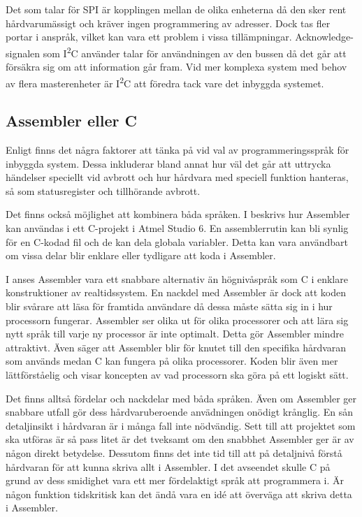 \documentclass[11pt]{article}
\begin{document}
\begin{flushleft}
Det som talar för SPI är kopplingen mellan de olika enheterna då den sker rent hårdvarumässigt och kräver ingen programmering av adresser. Dock tas fler portar i anspråk, vilket kan vara ett problem i vissa tillämpningar. Acknowledge-signalen som I\textsuperscript{2}C använder talar för användningen av den bussen då det går att försäkra sig om att information går fram. Vid mer komplexa system med behov av flera masterenheter är I\textsuperscript{2}C att föredra tack vare det inbyggda systemet. 

\subsection{Assembler eller C}

Enligt \cite{CPC} finns det några faktorer att tänka på vid val av programmeringsspråk för inbyggda system. Dessa inkluderar bland annat hur väl det går att uttrycka händelser speciellt vid avbrott och hur hårdvara med speciell funktion hanteras, så som statusregister och tillhörande avbrott.  

Det finns också möjlighet att kombinera båda språken. I \cite{AssC} beskrivs hur Assembler kan användas i ett C-projekt i Atmel Studio 6. En assemblerrutin kan bli synlig för en C-kodad fil och de kan dela globala variabler. Detta kan vara användbart om vissa delar blir enklare eller tydligare att koda i Assembler.

I \cite{RWD} anses Assembler vara ett snabbare alternativ än högnivåspråk som C i enklare konstruktioner av realtidssystem. En nackdel med Assembler är dock att koden blir svårare att läsa för framtida användare då dessa måste sätta sig in i hur processorn fungerar. Assembler ser olika ut för olika processorer och att lära sig nytt språk till varje ny processor är inte optimalt.  Detta gör Assembler mindre attraktivt. Även \cite{CPM} säger att Assembler blir för knutet till den specifika hårdvaran som används medan C kan fungera på olika processorer. Koden blir även mer lättförståelig och visar koncepten av vad processorn ska göra på ett logiskt sätt. 

Det finns alltså fördelar och nackdelar med båda språken. Även om Assembler ger snabbare utfall gör dess hårdvaruberoende anvädningen onödigt krånglig. En sån detaljinsikt i hårdvaran är i många fall inte nödvändig. Sett till att projektet som ska utföras är så pass litet är det tveksamt om den snabbhet Assembler ger är av någon direkt betydelse. Dessutom finns det inte tid till att på detaljnivå förstå hårdvaran för att kunna skriva allt i Assembler. I det avseendet skulle C på grund av dess smidighet vara ett mer fördelaktigt språk att programmera i. Är någon funktion tidskritisk kan det ändå vara en idé att överväga att skriva detta i Assembler. 


\end{flushleft}
\end{document}
